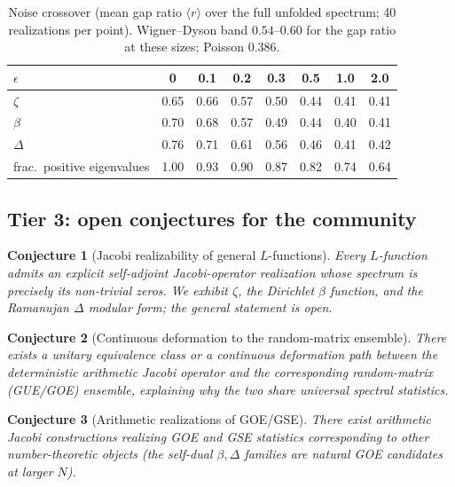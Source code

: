 \documentclass[aps,prx,reprint,floatfix]{revtex4-2}
\newtheorem{conjecture}{Conjecture}
\begin{document}
\begin{table}[htbp]
\centering\small
\caption{Noise crossover (mean gap ratio $\langle r\rangle$ over the full
unfolded spectrum; 40 realizations per point). Wigner--Dyson band
$0.54$--$0.60$ for the gap ratio at these sizes; Poisson $0.386$.}
\label{tab:epsc}
\begin{tabular}{lccccccc}
\toprule
$\epsilon$ & 0 & 0.1 & 0.2 & 0.3 & 0.5 & 1.0 & 2.0\\
\midrule
$\zeta$   & 0.65 & 0.66 & 0.57 & 0.50 & 0.44 & 0.41 & 0.41\\
$\beta$   & 0.70 & 0.68 & 0.57 & 0.49 & 0.44 & 0.40 & 0.41\\
$\Delta$  & 0.76 & 0.71 & 0.61 & 0.56 & 0.46 & 0.41 & 0.42\\
frac.\ positive eigenvalues & 1.00 & 0.93 & 0.90 & 0.87 & 0.82 & 0.74 & 0.64\\
\bottomrule
\end{tabular}
\end{table}

\subsection{Tier 3: open conjectures for the community}

\begin{conjecture}[Jacobi realizability of general $L$-functions]
Every $L$-function admits an explicit self-adjoint Jacobi-operator
realization whose spectrum is precisely its non-trivial zeros. We exhibit
$\zeta$, the Dirichlet $\beta$ function, and the Ramanujan $\Delta$ modular
form; the general statement is open.
\end{conjecture}

\begin{conjecture}[Continuous deformation to the random-matrix ensemble]
There exists a unitary equivalence class or a continuous deformation path
between the deterministic arithmetic Jacobi operator and the corresponding
random-matrix (GUE/GOE) ensemble, explaining why the two share universal
spectral statistics.
\end{conjecture}

\begin{conjecture}[Arithmetic realizations of GOE/GSE]
There exist arithmetic Jacobi constructions realizing GOE and GSE statistics
corresponding to other number-theoretic objects (the self-dual
$\beta,\Delta$ families are natural GOE candidates at larger $N$).
\end{conjecture}
\end{document}
